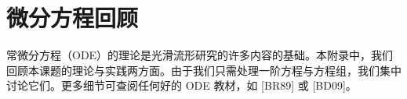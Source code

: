 \documentclass[../main.tex]{subfiles}
\begin{document}
\chapter{微分方程回顾}\label{chapter:appD-differential-equations-review}

常微分方程（ODE）的理论是光滑流形研究的许多内容的基础。本附录中，我们回顾本课题的理论与实践两方面。由于我们只需处理一阶方程与方程组，我们集中讨论它们。更多细节可查阅任何好的 ODE 教材，如 [BR89] 或 [BD09]。



\end{document}
